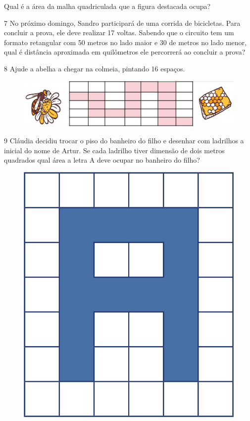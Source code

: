 Qual é a área da malha quadriculada que a figura destacada ocupa?


\num{7} No próximo domingo, Sandro participará de uma corrida de bicicletas.
Para concluir a prova, ele deve realizar 17 voltas. Sabendo que o circuito tem um formato
retangular com 50 metros no lado maior e 30 de metros no lado menor, qual é distância aproximada em quilômetros ele percorrerá ao concluir a prova?


\num{8} Ajude a abelha a chegar na colmeia, pintando 16 espaços.

\begin{figure}[htpb!]
\centering
\includegraphics[width=\textwidth]{media/image33a.png}
\end{figure}  


\num{9} Cláudia decidiu trocar o piso do banheiro do filho e desenhar com ladrilhos 
a inicial do nome de Artur. Se cada ladrilho tiver dimensão de dois metros quadrados 
qual área a letra A deve ocupar no banheiro do filho?

\begin{figure}[htpb!]
\centering
\includegraphics[width=.3\textwidth]{media/image29.png}
\end{figure}



